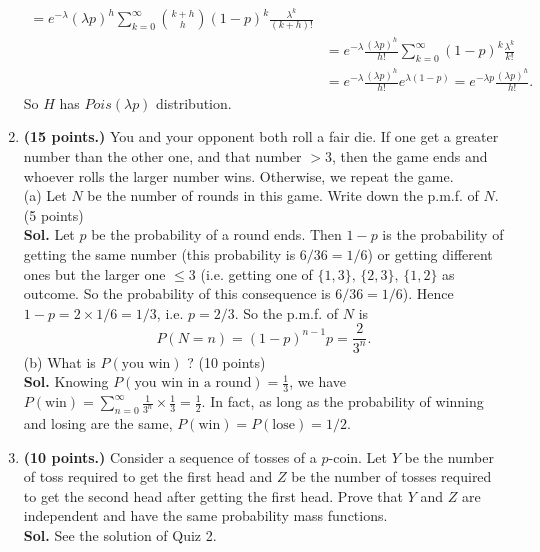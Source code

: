 \begin{enumerate}
\begin{equation*}
\begin{aligned}
    =e^{-\lambda}(\lambda p)^h\sum_{k=0}^\infty\binom{k+h}{h}(1-p)^{k}\frac{\lambda^k}{(k+h)!} \\&
    =e^{-\lambda}\frac{(\lambda p)^h}{h!}\sum_{k=0}^\infty(1-p)^{k}\frac{\lambda^k}{k!} \\&
    =e^{-\lambda}\frac{(\lambda p)^h}{h!}e^{\lambda(1-p)}=e^{-\lambda p}\frac{(\lambda p)^h}{h!}.
    \end{aligned}
    \end{equation*}
    So $H$ has $Pois(\lambda p)$ distribution.
    \item \textbf{(15 points.)} You and your opponent both roll a fair die. If one get a greater number than the other one, and that number $>3$, then the game ends and whoever rolls the larger number wins. Otherwise, we repeat the game.\\
    (a) Let $N$ be the number of rounds in this game. Write down the p.m.f. of $N$. (5 points) \\
    \textbf{Sol.} Let $p$ be the probability of a round ends. Then $1-p$ is the probability of getting the same number (this probability is $6/36=1/6$) or getting different ones but the larger one $\leq 3$ (i.e. getting one of $\{1,3\},\,\{2,3\},\,\{1,2\}$ as outcome. So the probability of this consequence is $6/36=1/6$). Hence $1-p=2\times 1/6=1/3$, i.e. $p=2/3$. So the p.m.f. of $N$ is
    \begin{equation*}
    P(N=n)=(1-p)^{n-1}p=\frac{2}{3^n}.
    \end{equation*}
    (b) What is $P(\text{you win})$ ? (10 points)\\
    \textbf{Sol.} Knowing $P(\text{you win in a round})=\frac{1}{3}$, we have $P(\text{win})=\sum_{n= 0}^\infty\frac{1}{3^n}\times\frac{1}{3}=\frac{1}{2}$. In fact, as long as the probability of winning and losing are the same, $P(\text{win})=P(\text{lose})=1/2$.

    \item \textbf{(10 points.)}
    Consider a sequence of tosses of a $p$-coin.
    Let $Y$ be the number of toss required to get the first head and $Z$ be the number of tosses required to get the second head after getting the first head.
    Prove that $Y$ and $Z$ are independent and have the same probability mass functions.\\
    \textbf{Sol.} See the solution of Quiz 2.


\end{enumerate}
